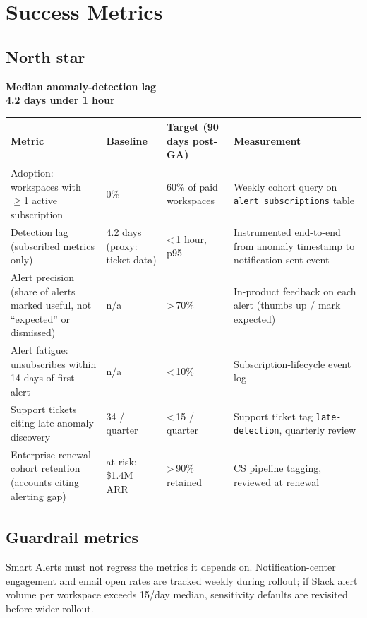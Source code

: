 \section{Success Metrics}

\subsection*{North star}
\begin{statusbox}
\centering
\Large\bfseries\color{prdaccent} Median anomaly-detection lag\\[2pt]
\large\color{prdink} 4.2 days \raisebox{0.1em}{\footnotesize$\to$} \textbf{under 1 hour}
\end{statusbox}

\vspace{0.8em}
\renewcommand{\arraystretch}{1.35}
\begin{tabularx}{\linewidth}{@{}Xp{2.3cm}p{2.3cm}p{3.6cm}@{}}
\toprule
\rowcolor{prdpale}
Metric & Baseline & Target (90 days post-GA) & Measurement \\
\midrule
Adoption: workspaces with $\geq$1 active subscription & 0\% & 60\% of paid workspaces &
  Weekly cohort query on \texttt{alert\_subscriptions} table \\
\addlinespace
Detection lag (subscribed metrics only) & 4.2 days (proxy: ticket data) & \textless\,1
  hour, p95 & Instrumented end-to-end from anomaly timestamp to notification-sent event \\
\addlinespace
Alert precision (share of alerts marked useful, not ``expected'' or dismissed) & n/a &
  \textgreater\,70\% & In-product feedback on each alert (thumbs up / mark expected) \\
\addlinespace
Alert fatigue: unsubscribes within 14 days of first alert & n/a & \textless\,10\% &
  Subscription-lifecycle event log \\
\addlinespace
Support tickets citing late anomaly discovery & 34 / quarter & \textless\,15 / quarter &
  Support ticket tag \texttt{late-detection}, quarterly review \\
\addlinespace
Enterprise renewal cohort retention (accounts citing alerting gap) & at risk: \$1.4M ARR
  & \textgreater\,90\% retained & CS pipeline tagging, reviewed at renewal \\
\bottomrule
\end{tabularx}

\subsection*{Guardrail metrics}
Smart Alerts must not regress the metrics it depends on. Notification-center engagement
and email open rates are tracked weekly during rollout; if Slack alert volume per
workspace exceeds 15/day median, sensitivity defaults are revisited before wider rollout.
